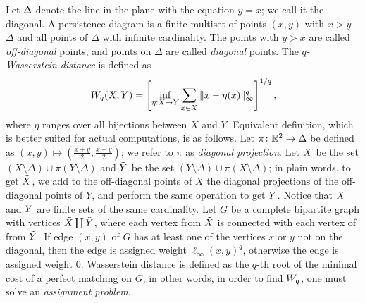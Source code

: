 Let ${\Delta}$ denote the line in the plane with the equation $y = x$; we call it the diagonal.
A persistence diagram is a finite multiset of points $(x, y)$ with $x > y$
$\Delta$ and all points of $\Delta$ with infinite cardinality.
The points with $y > x$ are called \textit{off-diagonal} points,
and points on $\Delta$ are called \textit{diagonal} points.
The \emph{$q$-Wasserstein distance} is defined as
\[
    {W_{q}}(X,Y) = \left[ \inf_{\eta:X\rightarrow Y} \sum_{x\in X} \|x-\eta(x)\|_\infty^q\right]^{1/q},
\]
where $\eta$ ranges over all bijections between $X$ and $Y$.
Equivalent definition, which is better suited for actual computations,
is as follows. Let $\pi\colon \mathbb{R}^2 \to \Delta$ be defined
as $(x,y) \mapsto (\frac{x+y}{2}, \frac{x+y}{2})$; we refer to $\pi$ as \textit{diagonal
projection}. Let ${\tilde{X}}$ be the set $(X\setminus \Delta) \cup \pi(Y \setminus \Delta)$
and ${\tilde{Y}}$ be the set $(Y\setminus \Delta) \cup \pi(X \setminus \Delta)$; in plain words,
to get ${\tilde{X}}$, we add to the off-diagonal points of $X$
the diagonal projections of the off-diagonal points of $Y$,
and perform the same operation to get ${\tilde{Y}}$. Notice that ${\tilde{X}}$ and ${\tilde{Y}}$
are finite sets of the same cardinality. Let $G$ be a complete bipartite
graph with vertices ${\tilde{X}} \coprod {\tilde{Y}}$, where each vertex from ${\tilde{X}}$
is connected with each vertex of from ${\tilde{Y}}$. If edge $(x,y)$ of $G$
has at least one of the vertices $x$ or $y$ not on the diagonal,
then the edge is assigned weight $\ell_{\infty}(x, y)^q$, otherwise
the edge is assigned weight 0. Wasserstein distance is defined as the $q$-th
root of the minimal cost of a perfect matching on $G$; in other words,
in order to find ${W_{q}}$, one must solve an \textit{assignment problem}.
